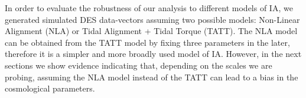 \documentclass[12pt]{article}
\begin{document}
\begin{small}
In order to evaluate the robustness of our analysis to different models of IA, we generated simulated DES data-vectors assuming two possible models: Non-Linear Alignment (NLA) or Tidal Alignment + Tidal Torque (TATT). The NLA model can be obtained from the TATT model by fixing three parameters in the later, therefore it is a simpler and more broadly used model of IA. However, in the next sections we show evidence indicating that, depending on the scales we are probing, assuming the NLA model instead of the TATT can lead to a bias in the cosmological parameters.  
%

\end{small}
\end{document}
